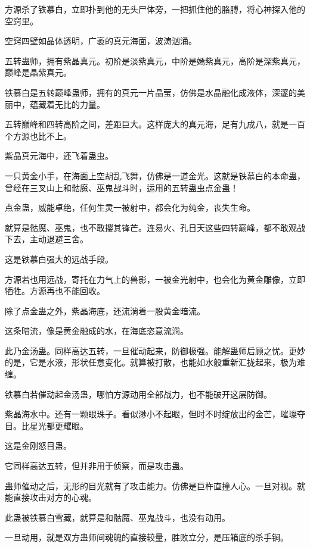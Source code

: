 
\begin{this_body}

方源杀了铁慕白，立即扑到他的无头尸体旁，一把抓住他的胳膊，将心神探入他的空窍里。

空窍四壁如晶体透明，广袤的真元海面，波涛汹涌。

五转蛊师，拥有紫晶真元。初阶是淡紫真元，中阶是嫣紫真元，高阶是深紫真元，巅峰是晶紫真元。

铁慕白是五转巅峰蛊师，拥有的真元一片晶莹，仿佛是水晶融化成液体，深邃的美丽中，蕴藏着无比的力量。

五转巅峰和四转高阶之间，差距巨大。这样庞大的真元海，足有九成八，就是一百个方源也比不上。

紫晶真元海中，还飞着蛊虫。

一只黄金小手，在海面上空胡乱飞舞，仿佛是一道金光。这就是铁慕白的本命蛊，曾经在三叉山上和骷魔、巫鬼战斗时，运用的五转蛊虫点金蛊！

点金蛊，威能卓绝，任何生灵一被射中，都会化为纯金，丧失生命。

就算是骷魔、巫鬼，也不敢撄其锋芒。连易火、孔日天这些四转巅峰，都不敢观战下去，主动退避三舍。

这是铁慕白强大的远战手段。

方源若也用远战，寄托在力气上的兽影，一被金光射中，也会化为黄金雕像，立即牺牲。方源再也不能回收。

除了点金蛊之外，紫晶海底，还流淌着一股黄金暗流。

这条暗流，像是黄金融成的水，在海底恣意流淌。

此乃金汤蛊。同样高达五转，一旦催动起来，防御极强。能解蛊师后顾之忧。更妙的是，它是水液，形状任意变化。就算被打散，也能如水般重新汇拢起来，极为难缠。

铁慕白若催动起金汤蛊，哪怕方源动用全部战力，也不能破开这层防御。

紫晶海水中。还有一颗眼珠子。看似渺小不起眼，但时不时绽放出的金芒，璀璨夺目。比星光都更耀眼。

这是金刚怒目蛊。

它同样高达五转，但并非用于侦察，而是攻击蛊。

蛊师催动之后，无形的目光就有了攻击能力。仿佛是巨杵直撞人心。一旦对视。就能直接攻击对方的心魂。

此蛊被铁慕白雪藏，就算是和骷魔、巫鬼战斗，也没有动用。

一旦动用，就是双方蛊师间魂魄的直接较量，胜败立分，是压箱底的杀手锏。


\end{this_body}
